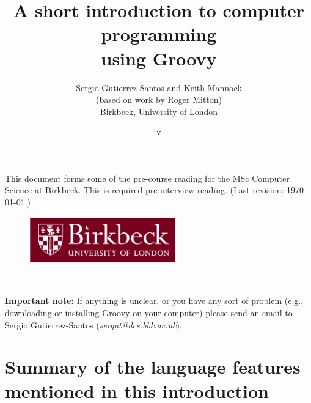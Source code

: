 \documentclass[11pt,a4paper]{article}
\title{A short introduction to computer programming\\
  using Groovy}
\author{Sergio Gutierrez-Santos and Keith Mannock\\
  (based on work by Roger Mitton)\\
  Birkbeck, University of London}
\date{v}
\begin{document}
\maketitle
\thispagestyle{empty}


\noindent This document forms some of the pre-course reading for the
MSc Computer Science at Birkbeck. This is required pre-interview
reading. 
(Last revision: \today.)

\vfill 

\begin{figure}[h!]
  \centering
  \includegraphics[height=2cm]{bbk.eps}
\end{figure}

\vfill 


\newpage
~ \vspace{8cm}

\textbf{Important note: } If anything is unclear, or you have any 
sort of problem (e.g.,
downloading or installing Groovy on your computer) please send an
email to Sergio Gutierrez-Santos (\emph{sergut@dcs.bbk.ac.uk}).
\newpage

\newpage

\newpage

\newpage

\newpage

\newpage
\section{Summary of the language features mentioned in this introduction}

\newpage

\end{document}
